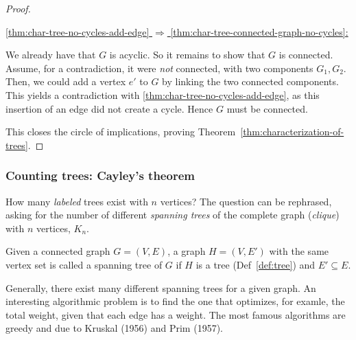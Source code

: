 \begin{proof}
\hypertarget{proof:char-tree-5-1}{
\underline{\ref{thm:char-tree-no-cycles-add-edge} $\Rightarrow$
          \ref{thm:char-tree-connected-graph-no-cycles}:}}

We already have that \(G\) is acyclic. 
So it remains to show that \(G\) is connected.
Assume, for a contradiction, it were \emph{not} connected, with two components \(G_1,G_2\).
Then, we could add a vertex $e'$ to $G$ by linking the two connected components. 
This yields a contradiction with \ref{thm:char-tree-no-cycles-add-edge}, as this insertion of an edge did not create a cycle.
Hence \(G\) must be connected.

This closes the circle of implications, proving Theorem~\ref{thm:characterization-of-trees}.
\end{proof}


\subsubsection{Counting trees: Cayley's theorem}
How many \emph{labeled} trees exist with \(n\) vertices?
The question can be rephrased, asking for the number of different \emph{spanning trees} of the complete graph (\emph{clique}) with \(n\) vertices, \(K_n\).
\begin{definition}\label{def:spanning-tree}
Given a connected graph \(G=(V,E)\), a graph \(H=(V,E')\) with the same vertex set is called a spanning tree of \(G\) if \(H\) is a tree (Def~\ref{def:tree}) and \(E' \subseteq E\).
\end{definition}
Generally, there exist many different spanning trees for a given graph.
An interesting algorithmic problem is to find the one that optimizes, for examle, the total weight, given that each edge has a weight.
The most famous algorithms are greedy and due to Kruskal (1956) and Prim (1957).

